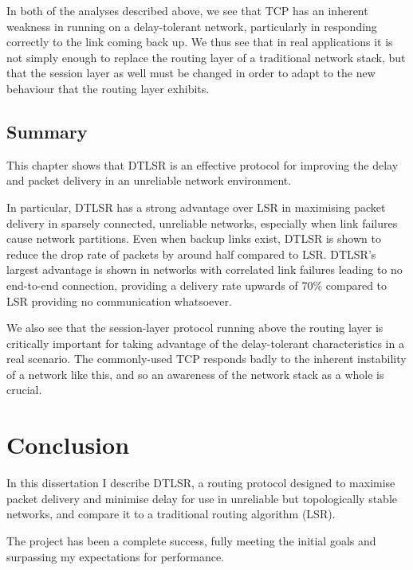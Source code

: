 \documentclass[withindex,glossary,openany]{cam-thesis}
\begin{document}
In both of the analyses described above, we see that TCP has an inherent weakness in running on a delay-tolerant network, particularly in responding correctly to the link coming back up. We thus see that in real applications it is not simply enough to replace the routing layer of a traditional network stack, but that the session layer as well must be changed in order to adapt to the new behaviour that the routing layer exhibits.


\section{Summary}

This chapter shows that DTLSR is an effective protocol for improving the delay and packet delivery in an unreliable network environment.

In particular, DTLSR has a strong advantage over LSR in maximising packet delivery in sparsely connected, unreliable networks, especially when link failures cause network partitions. Even when backup links exist, DTLSR is shown to reduce the drop rate of packets by around half compared to LSR. DTLSR's largest advantage is shown in networks with correlated link failures leading to no end-to-end connection, providing a delivery rate upwards of 70\% compared to LSR providing no communication whatsoever.

We also see that the session-layer protocol running above the routing layer is critically important for taking advantage of the delay-tolerant characteristics in a real scenario. The commonly-used TCP responds badly to the inherent instability of a network like this, and so an awareness of the network stack as a whole is crucial.

\chapter{Conclusion}

In this dissertation I describe DTLSR, a routing protocol designed to maximise packet delivery and minimise delay for use in unreliable but topologically stable networks, and compare it to a traditional routing algorithm (LSR).

The project has been a complete success, fully meeting the initial goals and surpassing my expectations for performance.
\end{document}
